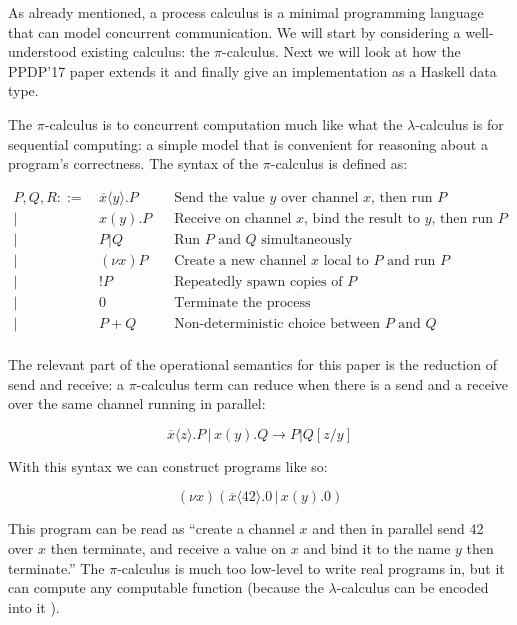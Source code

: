 \documentclass[runningheads,plain]{llncs}
\begin{document}
As already mentioned, a process calculus is a minimal programming
language that can model concurrent communication. We will start by
considering a well-understood existing calculus: the \(\pi\)-calculus.
Next we will look at how the PPDP'17 paper extends it and finally give
an implementation as a Haskell data type.

The \(\pi\)-calculus is to concurrent computation much like what the
\(\lambda\)-calculus is for sequential computing: a simple model that is
convenient for reasoning about a program's correctness. The syntax of
the \(\pi\)-calculus is defined as:

\begin{align*}
P, Q, R ::= \, & \overline{x} \langle y \rangle.P \,\,\, \, \, &\text{Send the value }y\text{ over channel }x\text{, then run }P \\
|\,\,\, & x(y).P \,\,\, \, \, & \text{Receive on channel }x\text{, bind the result to }y\text{, then run }P \\
|\,\,\, & P|Q \,\,\, \, \, \, \, \, \, &\text{Run }P\text{ and }Q\text{ simultaneously} \\
|\,\,\, & (\nu x)P  \,\,\, &\text{Create a new channel }x\text{ local to } P \text{ and run }P \\
|\,\,\, & !P \,\,\, &\text{Repeatedly spawn copies of }P \\
|\,\,\, & 0 & \text{Terminate the process} \\
|\,\,\, & P+Q \,\,\, \, \, \, \, \, \, &\text{Non-deterministic choice between }P\text{ and }Q\\
\end{align*}

The relevant part of the operational semantics for this paper is the
reduction of send and receive: a \(\pi\)-calculus term can reduce when
there is a send and a receive over the same channel running in parallel:

\[\overline{x}\langle z \rangle.P\, |\, x(y).Q \rightarrow P | Q[z/y]\]

With this syntax we can construct programs like so:

\[(\nu x)(\overline{x}\langle 42 \rangle.0\, |\, x(y).0)\]

This program can be read as ``create a channel \(x\) and then in
parallel send 42 over \(x\) then terminate, and receive a value on \(x\)
and bind it to the name \(y\) then terminate.'' The \(\pi\)-calculus is
much too low-level to write real programs in, but it can compute any
computable function (because the \(\lambda\)-calculus can be encoded
into it \cite{milner1992functions}).
\end{document}
